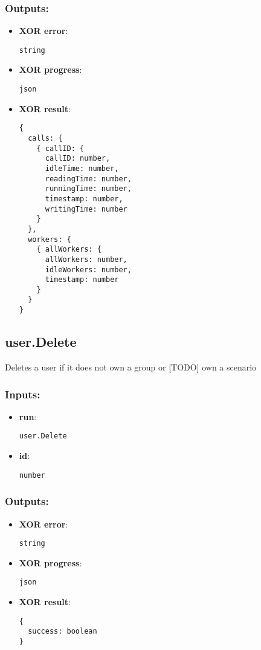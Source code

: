 \subsubsection*{Outputs:}
\begin{itemize}
    \item \textbf{XOR error}: 
\begin{lstlisting}
string
\end{lstlisting}
    \item \textbf{XOR progress}: 
\begin{lstlisting}
json
\end{lstlisting}
    \item \textbf{XOR result}: 
\begin{lstlisting}
{
  calls: {
    { callID: {
      callID: number, 
      idleTime: number, 
      readingTime: number, 
      runningTime: number, 
      timestamp: number, 
      writingTime: number
    }
  }, 
  workers: {
    { allWorkers: {
      allWorkers: number, 
      idleWorkers: number, 
      timestamp: number
    }
  }
}
\end{lstlisting}
  \end{itemize}

\subsection{user.Delete}
\label{ch:builtinservices:user.Delete}
Deletes a user if it does not own a group or [TODO] own a scenario
\subsubsection*{Inputs:}
\begin{itemize}
    \item \textbf{run}: 
\begin{lstlisting}
user.Delete
\end{lstlisting}
    \item \textbf{id}: 
\begin{lstlisting}
number
\end{lstlisting}
  \end{itemize}

\subsubsection*{Outputs:}
\begin{itemize}
    \item \textbf{XOR error}: 
\begin{lstlisting}
string
\end{lstlisting}
    \item \textbf{XOR progress}: 
\begin{lstlisting}
json
\end{lstlisting}
    \item \textbf{XOR result}: 
\begin{lstlisting}
{
  success: boolean
}
\end{lstlisting}
  \end{itemize}

